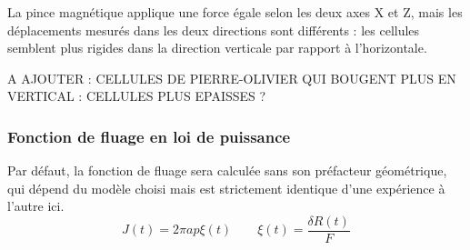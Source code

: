 \documentclass{report}
\begin{document}
La pince magnétique applique une force égale selon les deux axes X et Z, mais les déplacements mesurés dans les deux directions sont différents : les cellules semblent plus rigides dans la direction verticale par rapport à l'horizontale. 

A AJOUTER : CELLULES DE PIERRE-OLIVIER QUI BOUGENT PLUS EN VERTICAL : CELLULES PLUS EPAISSES ? 


\subsubsection{Fonction de fluage en loi de puissance}

Par défaut, la fonction de fluage sera calculée sans son préfacteur géométrique, qui dépend du modèle choisi mais est strictement identique d'une expérience à l'autre ici.
$$ J(t) = 2 \pi a p \xi (t)\qquad \xi (t) = \frac{\delta R (t)}{F}$$
	
\end{document}
